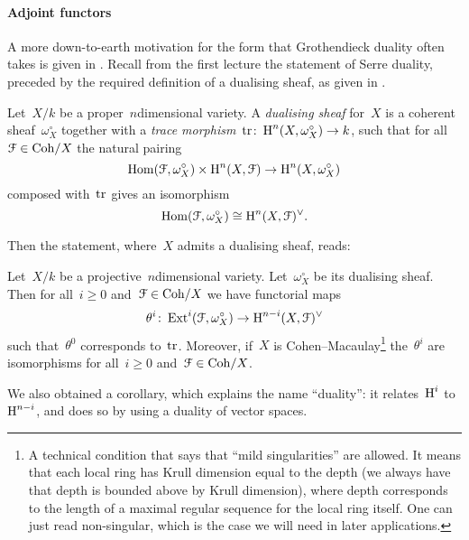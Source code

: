 \documentclass[10pt,a4paper]{article}
\begin{document}
\paragraph{Adjoint functors}
A more down-to-earth motivation for the form that Grothendieck duality often takes is given in \cite[chapter 6]{triangulated-categories}. Recall from the first lecture the statement of Serre duality, preceded by the required definition of a dualising sheaf, as given in \cite{hartshorne-algebraic-geometry}.
\begin{definition}
  Let~$X/k$ be a proper~$n$\dash dimensional variety. A \emph{dualising sheaf} for~$X$ is a coherent sheaf~$\omega_X^\circ$ together with a \emph{trace morphism}~$\operatorname{tr}\colon\operatorname{H}^n(X,\omega_X^\circ)\to k$, such that for all~$\mathcal{F}\in\mathrm{Coh}/X$ the natural pairing
  \begin{equation}
    \operatorname{Hom}(\mathcal{F},\omega_X^\circ)\times\operatorname{H}^n(X,\mathcal{F})\to\operatorname{H}^n(X,\omega_X^\circ)
  \end{equation}
  composed with~$\operatorname{tr}$ gives an isomorphism
  \begin{equation}
    \operatorname{Hom}(\mathcal{F},\omega_X^\circ)\cong\operatorname{H}^n(X,\mathcal{F})^\vee.
  \end{equation}
\end{definition}
Then the statement, where~$X$ admits a dualising sheaf, reads:
\begin{theorem}
  \label{theorem:serre-duality}
  Let~$X/k$ be a projective~$n$\dash dimensional variety. Let~$\omega_X^\circ$ be its dualising sheaf. Then for all~$i\geq 0$ and~$\mathcal{F}\in\mathrm{Coh}/X$ we have functorial maps
  \begin{equation}
    \theta^i\colon\operatorname{Ext}^i(\mathcal{F},\omega_X^\circ)\to\operatorname{H}^{n-i}(X,\mathcal{F})^\vee
  \end{equation}
  such that~$\theta^0$ corresponds to~$\operatorname{tr}$. Moreover, if~$X$ is Cohen--Macaulay\footnote{A technical condition that says that ``mild singularities'' are allowed. It means that each local ring has Krull dimension equal to the depth (we always have that depth is bounded above by Krull dimension), where depth corresponds to the length of a maximal regular sequence for the local ring itself. One can just read non-singular, which is the case we will need in later applications.} the~$\theta^i$ are isomorphisms for all~$i\geq 0$ and~$\mathcal{F}\in\mathrm{Coh}/X$.
\end{theorem}
We also obtained a corollary, which explains the name ``duality'': it relates~$\operatorname{H}^i$ to~$\operatorname{H}^{n-i}$, and does so by using a duality of vector spaces.
\end{document}
